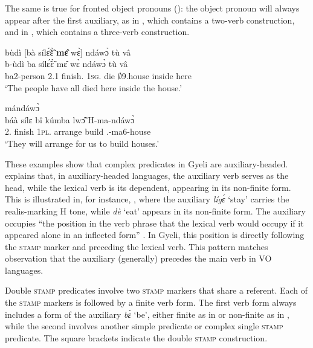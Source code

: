 The same is true for fronted object pronouns (): the object pronoun will always appear after the first auxiliary, as in , which contains a two-verb construction, and in , which contains a three-verb construction.

\ea\label{temponj1}
  \glll bùdì [bà sílɛ̃́ɛ̃̀ {\bfseries mɛ̂} wɛ̀] ndáwɔ̀ tù vâ\\
        b-ùdì {\db}ba sílɛ̃́ɛ̃̀ mɛ̂ wɛ̀ ndáwɔ̀ tù vâ \\
       ba2-person {\db}2.{\PST}1 finish.{\COMPL} 1\textsc{sg}.{\OBJ} die $\emptyset$9.house inside here\\
    \trans `The people have all died here inside the house.'
\z

\ea\label{tempobj2}
   mándáwɔ̀\\
        {\db}báà sílɛ bî kúmba lwɔ̃̂ H-ma-ndáwɔ̀ \\
        {\db}2.{\FUT} finish 1\textsc{pl}.{\OBJ} arrange build {\OBJ}.{\LINK}-ma6-house\\
    \trans `They will arrange for us to build houses.'
\z


These examples show that complex predicates in Gyeli are auxiliary-headed. \citet[9]{anderson2011b} explains that, in auxiliary-headed languages, the auxiliary verb serves as the head, while the lexical verb is its dependent,  appearing in its non-finite form. This is illustrated in, for instance, , where the auxiliary {\itshape lígɛ́} `stay' carries the realis-marking H tone, while {\itshape dè} `eat' appears in its non-finite form.
The auxiliary occupies ``the position in the verb phrase that the lexical verb would occupy if it appeared alone in an inflected form'' \citep[10]{anderson2011b}. In Gyeli, this position is directly following the \textsc{stamp} marker and preceding the lexical verb. This pattern matches  observation that the auxiliary (generally) precedes the main verb in VO languages.

Double \textsc{stamp} predicates involve two \textsc{stamp} markers that share a referent. Each of the \textsc{stamp} markers is followed by a finite verb form. The first verb form always includes a form of the auxiliary {\itshape bɛ̀} `be', either finite as in  or non-finite as in , while the second involves another simple predicate or complex single \textsc{stamp} predicate. The square brackets indicate the double \textsc{stamp} construction.

